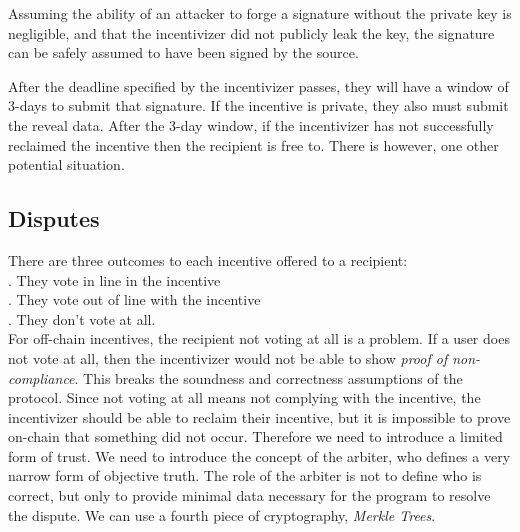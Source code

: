 \documentclass{article}
\begin{document}
Assuming the ability of an attacker to forge a signature without the private key is negligible, and that the incentivizer did not publicly leak the key, the signature can be safely assumed to have been signed by the source.

After the deadline specified by the incentivizer passes, they will have a window of 3-days to submit that signature. If the incentive is private, they also must submit the reveal data. After the 3-day window, if the incentivizer has not successfully reclaimed the incentive then the recipient is free to. There is however, one other potential situation.




\subsection{Disputes}

There are three outcomes to each incentive offered to a recipient:\\
. They vote in line in the incentive\\
. They vote out of line with the incentive\\
. They don't vote at all.\\

For off-chain incentives, the recipient not voting at all is a problem. If a user does not vote at all, then the incentivizer would not be able to show \emph{proof of non-compliance}. This breaks the soundness and correctness assumptions of the protocol. Since not voting at all means not complying with the incentive, the incentivizer should be able to reclaim their incentive, but it is impossible to prove on-chain that something did not occur. Therefore we need to introduce a limited form of trust. We need to introduce the concept of the arbiter, who defines a very narrow form of objective truth. The role of the arbiter is not to define who is correct, but only to provide minimal data necessary for the program to resolve the dispute. We can use a fourth piece of cryptography, \emph{Merkle Trees}.
\end{document}
